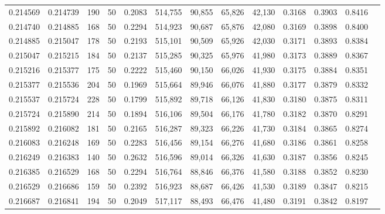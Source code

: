 \begin{tabular}{rrrrrrrrrrrrr}
0.214569 & 0.214739 &   190 &  50 &                                     0.2083 & 514,755 &  90,855 &  65,826 &  42,130 & 0.3168 & 0.3903 & 0.8416 \\
0.214740 & 0.214885 &   168 &  50 &                                     0.2294 & 514,923 &  90,687 &  65,876 &  42,080 & 0.3169 & 0.3898 & 0.8400 \\
0.214885 & 0.215047 &   178 &  50 &                                     0.2193 & 515,101 &  90,509 &  65,926 &  42,030 & 0.3171 & 0.3893 & 0.8384 \\
0.215047 & 0.215215 &   184 &  50 &                                     0.2137 & 515,285 &  90,325 &  65,976 &  41,980 & 0.3173 & 0.3889 & 0.8367 \\
0.215216 & 0.215377 &   175 &  50 &                                     0.2222 & 515,460 &  90,150 &  66,026 &  41,930 & 0.3175 & 0.3884 & 0.8351 \\
0.215377 & 0.215536 &   204 &  50 &                                     0.1969 & 515,664 &  89,946 &  66,076 &  41,880 & 0.3177 & 0.3879 & 0.8332 \\
0.215537 & 0.215724 &   228 &  50 &                                     0.1799 & 515,892 &  89,718 &  66,126 &  41,830 & 0.3180 & 0.3875 & 0.8311 \\
0.215724 & 0.215890 &   214 &  50 &                                     0.1894 & 516,106 &  89,504 &  66,176 &  41,780 & 0.3182 & 0.3870 & 0.8291 \\
0.215892 & 0.216082 &   181 &  50 &                                     0.2165 & 516,287 &  89,323 &  66,226 &  41,730 & 0.3184 & 0.3865 & 0.8274 \\
0.216083 & 0.216248 &   169 &  50 &                                     0.2283 & 516,456 &  89,154 &  66,276 &  41,680 & 0.3186 & 0.3861 & 0.8258 \\
0.216249 & 0.216383 &   140 &  50 &                                     0.2632 & 516,596 &  89,014 &  66,326 &  41,630 & 0.3187 & 0.3856 & 0.8245 \\
0.216385 & 0.216529 &   168 &  50 &                                     0.2294 & 516,764 &  88,846 &  66,376 &  41,580 & 0.3188 & 0.3852 & 0.8230 \\
0.216529 & 0.216686 &   159 &  50 &                                     0.2392 & 516,923 &  88,687 &  66,426 &  41,530 & 0.3189 & 0.3847 & 0.8215 \\
0.216687 & 0.216841 &   194 &  50 &                                     0.2049 & 517,117 &  88,493 &  66,476 &  41,480 & 0.3191 & 0.3842 & 0.8197 \\

\end{tabular}
